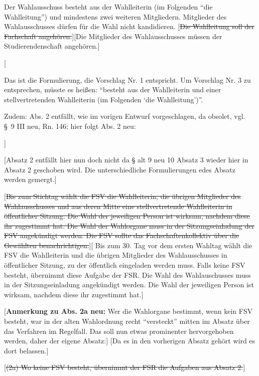 \documentclass[%
draft,%
multilinesections%
]{fswo}
\newcommand\oldT[1]  {{\color{Gray}[\st{#1}]}}
\newcommand\newT[1]  {{\color{Green}[#1]}}
\newcommand\bemFr[1] {{\color{Red}[#1]}}
\newcommand\bemFe[1] {{\color{Cyan}[#1]}}
\newcommand\bemTi[1] {{\color{Cyan}[#1]}} %
\newcommand\oldT[1]{}%
\newcommand\newT[1]{#1}
\newcommand\bemFr[1]{}%
\newcommand\bemFe[1]{}%
\newcommand\bemTi[1]{}%
\newcommand\change[2]{\oldT{#1}\newT{#2}}
\begin{document}
\begin{contract}
Der Wahlausschuss besteht aus der Wahlleiterin (im Folgenden \enquote{die Wahlleitung}) und mindestens zwei weiteren Mitgliedern.
Mitglieder des Wahlausschusses dürfen für die Wahl nicht kandidieren.
\change{Die Wahlleitung soll der Fachschaft angehören.}{Die Mitglieder des Wahlausschusses müssen der Studierendenschaft angehören.}
%
\bemFr{%
\begin{addmargin}{1cm}
Das ist die Formulierung, die Vorschlag Nr. 1 entspricht.
Um Vorschlag Nr. 3 zu entsprechen, müsste es heißen: \enquote{besteht aus der Wahlleiterin und einer stellvertretenden Wahlleiterin (im Folgenden \enquote{die Wahlleitung})}.

Zudem: Abs. 2 entfällt, wie im vorigen Entwurf vorgeschlagen, da obsolet, vgl. \S~9 III neu, Rn. 146; hier folgt Abs. 2 neu:
\end{addmargin}}
\bemTi{Absatz 2 entfällt hier nun doch nicht da § alt 9 neu 10 Absatz 3 wieder hier in Absatz 2 geschoben wird. Die unterschiedliche Formulierungen edes Absatz werden gemergt.}

\change{Bis zum Stichtag wählt die FSV die Wahlleiterin, die übrigen Mitglieder des Wahlausschusses und aus deren Mitte eine stellvertretende Wahlleiterin in öffentlicher Sitzung.
Die Wahl der jeweiligen Person ist wirksam, nachdem diese ihr zugestimmt hat.
Die Wahl der Wahlorgane muss in der Sitzungseinladung der FSV angekündigt werden.
Die FSV sollte das Fachschaftenkollektiv über die Gewählten benachrichtigen.}{%
Bis zum 30. Tag vor dem ersten Wahltag wählt die FSV die Wahlleiterin und die übrigen Mitglieder des Wahlausschusses in öffentlicher Sitzung, zu der öffentlich eingeladen werden muss.
Falls keine FSV besteht, übernimmt diese Aufgabe der FSR.
Die Wahl des Wahlauschusses muss in der Sitzungseinladung angekündigt werden.
Die Wahl der jeweiligen Person ist wirksam, nachdem diese ihr zugestimmt hat.}\\
%
\begin{addmargin}{1cm}
\bemFr{\textbf{Anmerkung zu Abs. 2a neu:} Wer die Wahlorgane bestimmt, wenn kein FSV besteht,
war in der alten Wahlordnung recht \enquote{versteckt} mitten im Absatz über das Verfahren im Regelfall.
Das soll nun etwas prominenter hervorgehoben werden, daher der eigene Absatz:}
\bemTi{Da es in den vorherigen Absatz gehört wird es dort belassen.}
\end{addmargin}
%
\oldT{(2a) Wo keine FSV besteht, übernimmt der FSR die Aufgaben aus Absatz 2.}



\end{contract}
\end{document}
